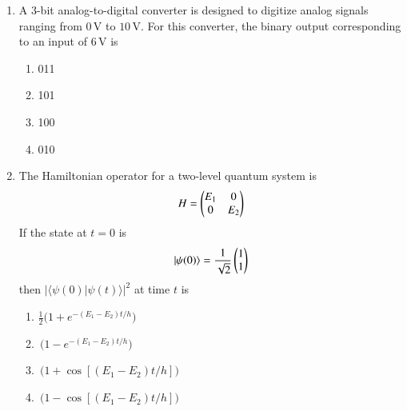\documentclass[journal,12pt,onecolumn]{IEEEtran}
\begin{document}
\begin{enumerate}[itemsep=0.45cm]
\hfill{}

    \begin{multicols}{4}
    \begin{enumerate}
        \item $F^{1/3}$
        \item $F^{1/2}$
        \item $F^{2/5}$
        \item $F^{2/3}$
    \end{enumerate}
    \end{multicols}



 \item A 3-bit analog-to-digital converter is designed to digitize analog signals ranging from $0\,\mathrm{V}$ to $10\,\mathrm{V}$. For this converter, the binary output corresponding to an input of $6\,\mathrm{V}$ is

 \hfill{}

    \begin{multicols}{2}
    \begin{enumerate}
        \item 011
        \item 101
        \item 100
        \item 010
    \end{enumerate}
    \end{multicols}

 \item The Hamiltonian operator for a two-level quantum system is
    \[
      H=\begin{pmatrix}E_1 & 0\\ 0 & E_2\end{pmatrix}
    \]
    If the state at $t=0$ is
    \[
      \lvert \psi(0)\rangle=\frac{1}{\sqrt{2}} \begin{pmatrix}1\\1\end{pmatrix}
    \]
    then $\lvert\langle \psi(0)\vert \psi(t)\rangle\rvert^2$ at time $t$ is

    \hfill{}

    \begin{multicols}{2}
    \begin{enumerate}
        \item $\tfrac{1}{2}\bigl(1+e^{-(E_1-E_2)t/h}\bigr)$
        \item $\,\bigl(1-e^{-(E_1-E_2)t/h}\bigr)$
        \item $\,\bigl(1+\cos[(E_1-E_2)t/h]\bigr)$
        \item $\,\bigl(1-\cos[(E_1-E_2)t/h]\bigr)$
    \end{enumerate}
    \end{multicols}


\end{enumerate}
\end{document}
